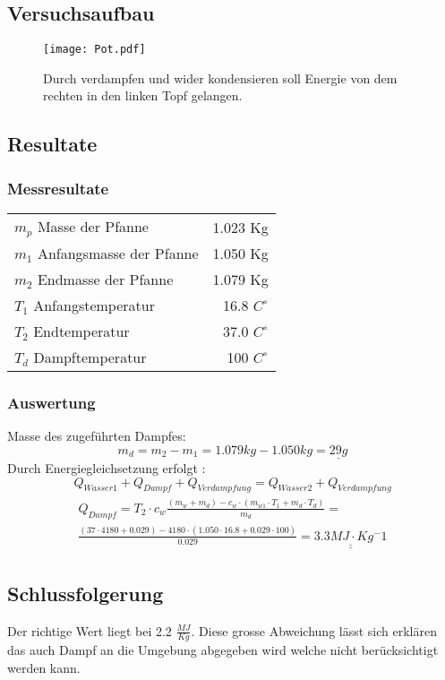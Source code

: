 \documentclass{article}
\begin{document}
\subsection{Versuchsaufbau}
\begin{figure}[H]
\texttt{[image: Pot.pdf]} 
\caption{Durch verdampfen und wider kondensieren soll Energie von dem rechten in den linken Topf gelangen.}
\end{figure}
\subsection{Resultate}
\subsubsection{Messresultate}
\begin{tabular}[H]{l r}
$m_p$ Masse der Pfanne & 1.023 Kg \\
$m_1$ Anfangsmasse der Pfanne & 1.050 Kg \\
$m_2$ Endmasse der Pfanne &  1.079 Kg \\
$T_1$ Anfangstemperatur & 16.8 $C^\circ$ \\
$T_2$ Endtemperatur & 37.0 $C^\circ$ \\
$T_d$ Dampftemperatur & 100 $C^\circ$ 

\end{tabular}

\subsubsection{Auswertung}
Masse des zugeführten Dampfes:
\begin{equation}
m_d = m_2 - m_1 = 1.079kg - 1.050 kg = \underline{29g}  
\end{equation}
Durch Energiegleichsetzung erfolgt :
\begin{equation}
Q_{Wasser1}+Q_{Dampf}+Q_{Verdampfung} = Q_{Wasser2}+Q_{Verdampfung}
\end{equation}
\begin{align}
\begin{split}
Q_{Dampf}= T_2 \cdot c_w \frac{(m_w+m_d)-c_w\cdot (m_{w1} \cdot T_{1}+m_d\cdot T_d)}{m_d} = \\ \frac{(37 \cdot 4180  + 0.029)-4180 \cdot (1.050 \cdot 16.8 + 0.029 \cdot 100)}{0.029} = \underline{\underline{3.3 MJ \cdot Kg^-1}} 
\end{split}
\end{align}

\subsection{Schlussfolgerung}
Der richtige Wert liegt bei 2.2 $\frac{MJ}{Kg}$. Diese grosse Abweichung lässt sich erklären das auch Dampf an die Umgebung abgegeben wird welche nicht berücksichtigt werden kann.  
\end{document}

